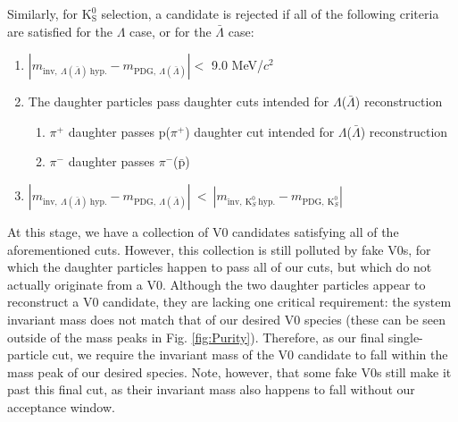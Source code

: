 \documentclass[ALICE,manyauthors]{cernphprep}
\newcommand{\Lam}{$\Lambda$\xspace}
\newcommand{\ALam}{$\bar{\Lambda}$\xspace}
\newcommand{\LamALam}{$\Lambda$($\bar{\Lambda}$)\xspace}
\newcommand{\Ks}{$\mathrm{K^{0}_{S}}$\xspace}
\begin{document}
Similarly, for \Ks selection, a candidate is rejected if all of the following criteria are satisfied for the \Lam case, or for the \ALam case:

\begin{enumerate}
 \item $\left|m_{\mathrm{inv}, \ \Lambda(\bar{\Lambda}) \ \mathrm{hyp.}} - m_{\mathrm{PDG},\ \Lambda(\bar{\Lambda})}\right| < $ 9.0 MeV/$c^{2}$
 \item The daughter particles pass daughter cuts intended for \LamALam reconstruction
 \begin{enumerate}
  \item $\pi^{+}$ daughter passes p($\pi^{+}$) daughter cut intended for \LamALam reconstruction
  \item $\pi^{-}$ daughter passes $\pi^{-}$($\bar{\mathrm{p}}$)
 \end{enumerate}
 \item $\left|m_{\mathrm{inv}, \ \Lambda(\bar{\Lambda}) \ \mathrm{hyp.}} - m_{\mathrm{PDG},\ \Lambda(\bar{\Lambda})}\right|~ < ~\left|m_{\mathrm{inv},~ \mathrm{K}^{0}_{S}~ \mathrm{hyp.}} - m_{\mathrm{PDG},~ \mathrm{K}^{0}_{S}}\right|$
\end{enumerate} 

At this stage, we have a collection of V0 candidates satisfying all of the aforementioned cuts.
However, this collection is still polluted by fake V0s, for which the daughter particles happen to pass all of our cuts, but which do not actually originate from a V0.
Although the two daughter particles appear to reconstruct a V0 candidate, they are lacking one critical requirement: the system invariant mass does not match that of our desired V0 species (these can be seen outside of the mass peaks in Fig. \ref{fig:Purity}).
Therefore, as our final single-particle cut, we require the invariant mass of the V0 candidate to fall within the mass peak of our desired species.
Note, however, that some fake V0s still make it past this final cut, as their invariant mass also happens to fall without our acceptance window.
\end{document}
